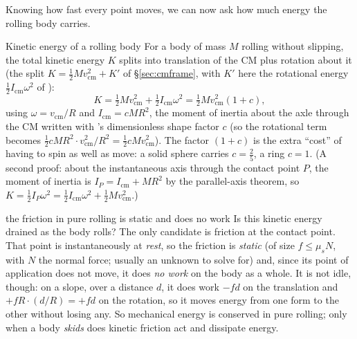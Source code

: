 
Knowing how fast every point moves, we can now ask how much energy the rolling body carries.

\begin{keybox}{Kinetic energy of a rolling body}
For a body of mass $M$ rolling without slipping, the total kinetic energy $K$ splits into translation of the
CM plus rotation about it (the split $K=\tfrac12Mv_{\text{cm}}^2+K'$ of \S\ref{sec:cmframe}, with $K'$
here the rotational energy $\tfrac12I_{\text{cm}}\omega^2$ of ):
\[
K=\tfrac12 Mv_{\text{cm}}^2+\tfrac12 I_{\text{cm}}\omega^2=\tfrac12 Mv_{\text{cm}}^2(1+c),
\]
using $\omega=v_{\text{cm}}/R$ and $I_{\text{cm}}=cMR^2$, the moment of inertia about the axle through the
CM written with 's dimensionless shape factor $c$ (so the rotational term becomes
$\tfrac12 cMR^2\cdot v_{\text{cm}}^2/R^2=\tfrac12 cMv_{\text{cm}}^2$). The factor $(1+c)$ is the extra
``cost'' of having to spin as well as move: a solid sphere carries $c=\tfrac25$, a ring $c=1$.
(A second proof: about the instantaneous axis through the contact point $P$, the moment of inertia is
$I_P=I_{\text{cm}}+MR^2$ by the parallel-axis theorem, so
$K=\tfrac12 I_P\omega^2=\tfrac12 I_{\text{cm}}\omega^2+\tfrac12 Mv_{\text{cm}}^2$.)
\end{keybox}

\begin{trapbox}{the friction in pure rolling is static and does no work}
Is this kinetic energy drained as the body rolls? The only candidate is friction at the contact point.
That point is instantaneously at \emph{rest}, so the friction is \emph{static} (of size $f\le\mu_s N$, with
$N$ the normal force; usually an unknown to solve for) and, since its point of application does not move,
it does \emph{no work} on the body as a whole. It is not idle, though: on a slope,
over a distance $d$, it does work $-fd$ on the translation and $+fR\cdot(d/R)=+fd$ on the rotation, so it
moves energy from one form to the other without losing any. So mechanical energy is conserved in pure
rolling; only when a body \emph{skids} does kinetic friction act and dissipate energy.
\end{trapbox}


